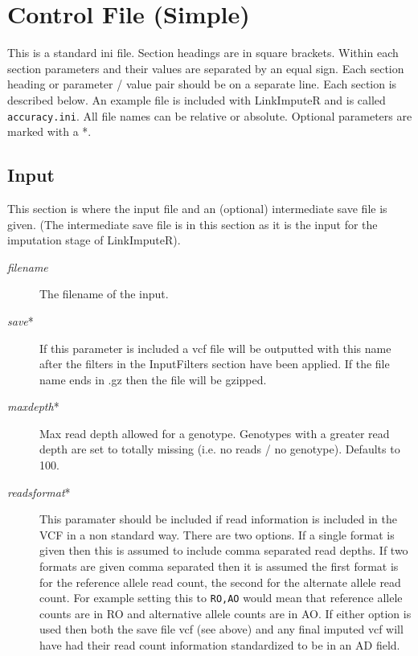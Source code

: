 \documentclass[10pt]{report}
\begin{document}
\section{Control File (Simple)}
\label{sec:ini}
This is a standard ini file.  Section headings are in square brackets.  Within each section parameters and their values are separated by an equal sign.  Each section heading or parameter / value pair should be on a separate line.  Each section is described below.  An example file is included with LinkImputeR and is called \texttt{accuracy.ini}.  All file names can be relative or absolute.  Optional parameters are marked with a *.

\subsection{Input}
This section is where the input file and an (optional) intermediate save file is given. (The intermediate save file is in this section as it is the input for the imputation stage of LinkImputeR).
\begin{description}
\item[\emph{filename}] The filename of the input.
\item[\emph{save}*] If this parameter is included a vcf file will be outputted with this name after the filters in the InputFilters section have been applied.  If the file name ends in .gz then the file will be gzipped.
\item[\emph{maxdepth}*] Max read depth allowed for a genotype.  Genotypes with a greater read depth are set to totally missing (i.e. no reads / no genotype). Defaults to 100.
\item[\emph{readsformat}*] This paramater should be included if read information is included in the VCF in a non standard way.  There are two options.  If a single format is given then this is assumed to include comma separated read depths.  If two formats are given comma separated then it is assumed the first format is for the reference allele read count, the second for the alternate allele read count.  For example setting this to \texttt{RO,AO} would mean that reference allele counts are in RO and alternative allele counts are in AO.  If either option is used then both the save file vcf (see above) and any final imputed vcf will have had their read count information standardized to be in an AD field.
\end{description}
\end{document}
